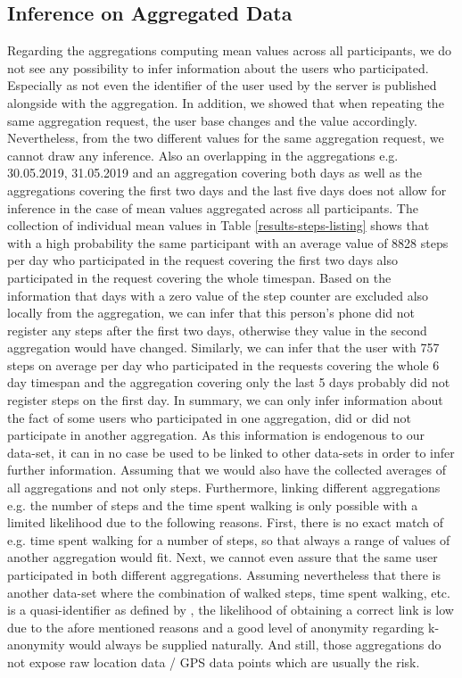 \subsection{Inference on Aggregated Data}\label{inference}
Regarding the aggregations computing mean values across all participants, we do not see any possibility to infer information about the users who participated. Especially as not even the identifier of the user used by the server is published alongside with the aggregation. In addition, we showed that when repeating the same aggregation request, the user base changes and the value accordingly. Nevertheless, from the two different values for the same aggregation request, we cannot draw any inference. Also an overlapping in the aggregations e.g. 30.05.2019, 31.05.2019 and an aggregation covering both days as well as the aggregations covering the first two days and the last five days does not allow for inference in the case of mean values aggregated across all participants.
The collection of individual mean values in Table \ref{results-steps-listing} shows that with a high probability the same participant with an average value of 8828 steps per day who participated in the request covering the first two days also participated in the request covering the whole timespan. Based on the information that days with a zero value of the step counter are excluded also locally from the aggregation, we can infer that this person's phone did not register any steps after the first two days, otherwise they value in the second aggregation would have changed. Similarly, we can infer that the user with 757 steps on average per day who participated in the requests covering the whole 6 day timespan and the aggregation covering only the last 5 days probably did not register steps on the first day.
In summary, we can only infer information about the fact of some users who participated in one aggregation, did or did not participate in another aggregation. As this information is endogenous to our data-set, it can in no case be used to be linked to other data-sets in order to infer further information.
Assuming that we would also have the collected averages of all aggregations and not only steps.
Furthermore, linking different aggregations e.g. the number of steps and the time spent walking is only possible with a limited likelihood due to the following reasons. First, there is no exact match of e.g. time spent walking for a number of steps, so that always a range of values of another aggregation would fit. Next, we cannot even assure that the same user participated in both different aggregations. Assuming nevertheless that there is another data-set where the combination of walked steps, time spent walking, etc. is a quasi-identifier as defined by \parencite{k-anonymity-achieving}, the likelihood of obtaining a correct link is low due to the afore mentioned reasons and a good level of anonymity regarding k-anonymity would always be supplied naturally. And still, those aggregations do not expose raw location data / GPS data points which are usually the risk.

